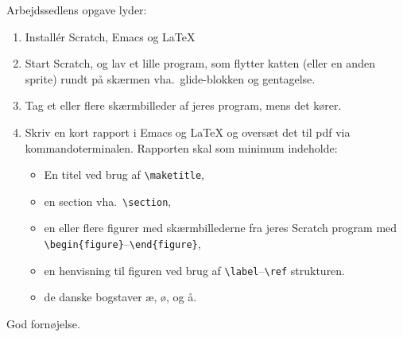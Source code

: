 \documentclass[a4paper,12pt]{article}
\begin{document}
Arbejdssedlens opgave lyder:
\begin{enumerate}[label=0.\arabic*,start=0]
\item Install\'{e}r Scratch, Emacs og LaTeX
\item Start Scratch, og lav et lille program, som flytter katten (eller en anden sprite) rundt på skærmen vha.\ glide-blokken og gentagelse.
\item Tag et eller flere skærmbilleder af jeres program, mens det kører.
\item Skriv en kort rapport i Emacs og LaTeX og oversæt det til pdf via kommandoterminalen. Rapporten skal som minimum indeholde:
  \begin{itemize}
  \item En titel ved brug af \verb|\maketitle|, 
  \item en section vha.\ \verb|\section|,
  \item en eller flere figurer med skærmbillederne fra jeres Scratch program med \verb|\begin{figure}|--\verb|\end{figure}|,
  \item en henvisning til figuren ved brug af \verb|\label|--\verb|\ref| strukturen.
  \item de danske bogstaver æ, ø, og å.
  \end{itemize}
\end{enumerate}

\flushright God fornøjelse.
\end{document}
